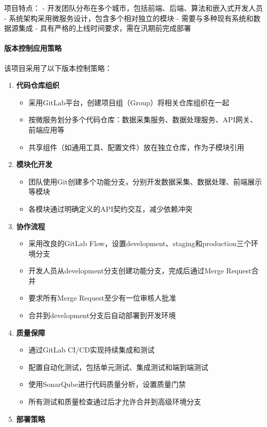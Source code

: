 项目特点： -
开发团队分布在多个城市，包括前端、后端、算法和嵌入式开发人员 -
系统架构采用微服务设计，包含多个相对独立的模块 -
需要与多种现有系统和数据源集成 -
具有严格的上线时间要求，需在汛期前完成部署

\paragraph{版本控制应用策略}\label{ux7248ux672cux63a7ux5236ux5e94ux7528ux7b56ux7565}

该项目采用了以下版本控制策略：

\begin{enumerate}
\def\labelenumi{\arabic{enumi}.}
\tightlist
\item
  \textbf{代码仓库组织}

  \begin{itemize}
  \tightlist
  \item
    采用GitLab平台，创建项目组（Group）将相关仓库组织在一起
  \item
    按微服务划分多个代码仓库：数据采集服务、数据处理服务、API网关、前端应用等
  \item
    共享组件（如通用工具、配置文件）放在独立仓库，作为子模块引用
  \end{itemize}
\item
  \textbf{模块化开发}

  \begin{itemize}
  \tightlist
  \item
    团队使用Git创建多个功能分支，分别开发数据采集、数据处理、前端展示等模块
  \item
    各模块通过明确定义的API契约交互，减少依赖冲突
  \end{itemize}
\item
  \textbf{协作流程}

  \begin{itemize}
  \tightlist
  \item
    采用改良的GitLab
    Flow，设置development、staging和production三个环境分支
  \item
    开发人员从development分支创建功能分支，完成后通过Merge Request合并
  \item
    要求所有Merge Request至少有一位审核人批准
  \item
    合并到development分支后自动部署到开发环境
  \end{itemize}
\item
  \textbf{质量保障}

  \begin{itemize}
  \tightlist
  \item
    通过GitLab CI/CD实现持续集成和测试
  \item
    配置自动化测试，包括单元测试、集成测试和端到端测试
  \item
    使用SonarQube进行代码质量分析，设置质量门禁
  \item
    所有测试和质量检查通过后才允许合并到高级环境分支
  \end{itemize}
\item
  \textbf{部署策略}


\end{enumerate}

